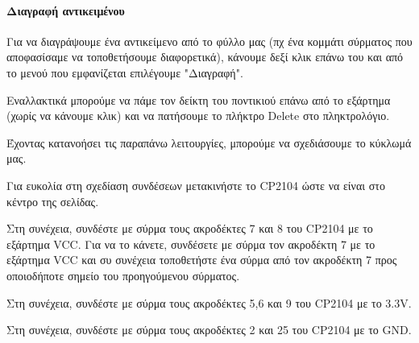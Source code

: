 \documentclass[a4paper]{article}
\begin{document}
\begin{figure}
  \begin{center}
    \label{fig:kicad-main}
  \end{center}
\end{figure}

\begin{figure}
  \begin{center}
    \label{fig:kicad-main}
  \end{center}
\end{figure}

\paragraph{Διαγραφή αντικειμένου}
Για να διαγράψουμε ένα αντικείμενο από το φύλλο μας (πχ ένα κομμάτι σύρματος που αποφασίσαμε να τοποθετήσουμε διαφορετικά), κάνουμε δεξί κλικ επάνω του και από το μενού που εμφανίζεται επιλέγουμε "Διαγραφή".

Εναλλακτικά μπορούμε να πάμε τον δείκτη του ποντικιού επάνω από το εξάρτημα (χωρίς να κάνουμε κλικ) και να πατήσουμε το πλήκτρο Delete στο πληκτρολόγιο.

Έχοντας κατανοήσει τις παραπάνω λειτουργίες, μπορούμε να σχεδιάσουμε το κύκλωμά μας.

Για ευκολία στη σχεδίαση συνδέσεων μετακινήστε το \textenglish{CP2104} ώστε να είναι στο κέντρο της σελίδας.

Στη συνέχεια, συνδέστε με σύρμα τους ακροδέκτες 7 και 8 του \textenglish{CP2104} με το εξάρτημα VCC. Για να το κάνετε, συνδέσετε με σύρμα τον ακροδέκτη 7 με το εξάρτημα VCC και συ συνέχεια τοποθετήστε ένα σύρμα από τον  ακροδέκτη 7 προς οποιοδήποτε σημείο του προηγούμενου σύρματος.

Στη συνέχεια, συνδέστε με σύρμα τους ακροδέκτες 5,6 και 9 του \textenglish{CP2104} με το 3.3V.

Στη συνέχεια, συνδέστε με σύρμα τους ακροδέκτες 2 και 25 του \textenglish{CP2104} με το GND.

\begin{figure}
  \begin{center}
    \label{fig:kicad-main}
  \end{center}
\end{figure}
\end{document}

